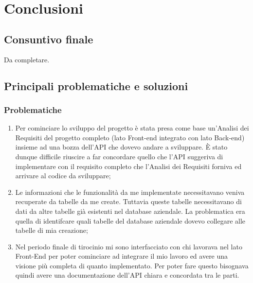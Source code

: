 \chapter{Conclusioni}
\label{cap:conclusioni}

\section{Consuntivo finale}
Da completare.

\section{Principali problematiche e soluzioni}
\subsection{Problematiche}
\begin{enumerate}
\item Per cominciare lo sviluppo del progetto è stata presa come base un’Analisi dei Requisiti del progetto completo (lato Front-end integrato con lato Back-end) insieme ad una bozza dell'API che dovevo andare a sviluppare. È stato dunque difficile riuscire a far concordare quello che l’API suggeriva di implementare con il requisito completo che l’Analisi dei Requisiti forniva ed arrivare al codice da sviluppare;
\item Le informazioni che le funzionalità da me implementate necessitavano veniva recuperate da tabelle da me create. Tuttavia queste tabelle necessitavano di dati da altre tabelle già esistenti nel database aziendale. La problematica era quella di identifcare quali tabelle del database aziendale dovevo collegare alle tabelle di mia creazione; 
\item Nel periodo finale di tirocinio mi sono interfacciato con chi lavorava nel lato Front-End per poter cominciare ad integrare il mio lavoro ed avere una visione più completa di quanto implementato. Per poter fare questo bisognava quindi avere una documentazione dell’API chiara e concordata tra le parti.
\end{enumerate}


